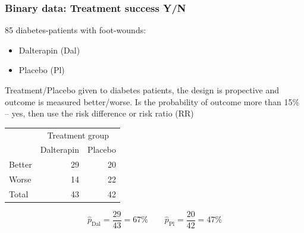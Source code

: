 \documentclass[handout,12pt,dvipsnames,t]{beamer}
\begin{document}
\begin{frame}[fragile]
\frametitle{Binary data: Treatment success Y/N}
85 diabetes-patients with foot-wounds:
\begin{itemize}
\item Dalterapin (Dal)
\item Placebo (Pl)
\end{itemize}

Treatment/Placebo given to diabetes patients, the design is
propective and outcome is measured better/worse. Is the probability of outcome more than 15\% -- yes, then use the risk difference or risk ratio (RR) 


\begin{center}
\begin{tabular}{l|r|r}
\hline
\multicolumn{1}{c|}{ } & \multicolumn{2}{|c}{Treatment group} \\
\cline{2-3}
  & Dalterapin & Placebo\\
\hline
Better & 29 & 20\\
\hline
Worse & 14 & 22\\
\hline
Total & 43 & 42\\
\hline
\end{tabular}\end{center}

\[
\hat p_\text{Dal} = \frac{29}{43} = 67\% \qquad
\hat p_\text{Pl}  = \frac{20}{42} = 47\%
\]

\end{frame}
\end{document}

